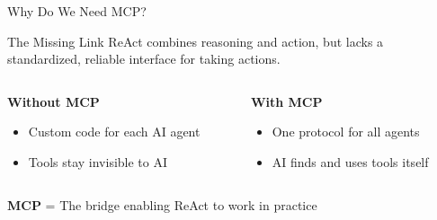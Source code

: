 \documentclass[aspectratio=169]{beamer}
\begin{document}
\begin{frame}{Why Do We Need MCP?}
  \begin{block}{The Missing Link}
    ReAct combines reasoning and action, but lacks a standardized, reliable interface for taking actions.
  \end{block}

  \vspace{0.5cm}

  \begin{columns}[T]
    \begin{column}{0.48\textwidth}
      \centering
      \large\bfseries
      \textcolor{conesaOrange}{Without MCP}

      \vspace{0.5cm}
      \normalsize

      \begin{itemize}
        \item Custom code for each AI agent
        \item Tools stay invisible to AI
      \end{itemize}
    \end{column}
    \begin{column}{0.48\textwidth}
      \centering
      \large\bfseries
      \textcolor{conesaTeal}{With MCP}

      \vspace{0.5cm}
      \normalsize

      \begin{itemize}
        \item One protocol for all agents
        \item AI finds and uses tools itself
      \end{itemize}
    \end{column}
  \end{columns}

  \vspace{0.5cm}
  \centering
  \normalsize
  \textbf{MCP} = The bridge enabling ReAct to work in practice\supercite{anthropic2024mcp}
\end{frame}
\end{document}
